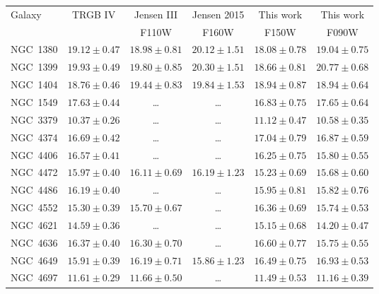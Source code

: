 \begin{tabular}{lccccc}
\toprule
Galaxy & TRGB IV & Jensen III & Jensen 2015 & This work & This work \\
 & & F110W & F160W & F150W & F090W \\
\midrule
NGC~1380 & $19.12\pm0.47$ & $18.98\pm0.81$ & $20.12\pm1.51$ & $18.08\pm0.78$ & $19.04\pm0.75$ \\
NGC~1399 & $19.93\pm0.49$ & $19.80\pm0.85$ & $20.30\pm1.51$ & $18.66\pm0.81$ & $20.77\pm0.68$ \\
NGC~1404 & $18.76\pm0.46$ & $19.44\pm0.83$ & $19.84\pm1.53$ & $18.94\pm0.87$ & $18.94\pm0.64$ \\
NGC~1549 & $17.63\pm0.44$ & \ldots & \ldots & $16.83\pm0.75$ & $17.65\pm0.64$ \\
NGC~3379 & $10.37\pm0.26$ & \ldots & \ldots & $11.12\pm0.47$ & $10.58\pm0.35$ \\
NGC~4374 & $16.69\pm0.42$ & \ldots & \ldots & $17.04\pm0.79$ & $16.87\pm0.59$ \\
NGC~4406 & $16.57\pm0.41$ & \ldots & \ldots & $16.25\pm0.75$ & $15.80\pm0.55$ \\
NGC~4472 & $15.97\pm0.40$ & $16.11\pm0.69$ & $16.19\pm1.23$ & $15.23\pm0.69$ & $15.68\pm0.60$ \\
NGC~4486 & $16.19\pm0.40$ & \ldots & \ldots & $15.95\pm0.81$ & $15.82\pm0.76$ \\
NGC~4552 & $15.30\pm0.39$ & $15.70\pm0.67$ & \ldots & $16.36\pm0.69$ & $15.74\pm0.53$ \\
NGC~4621 & $14.59\pm0.36$ & \ldots & \ldots & $15.15\pm0.68$ & $14.20\pm0.47$ \\
NGC~4636 & $16.37\pm0.40$ & $16.30\pm0.70$ & \ldots & $16.60\pm0.77$ & $15.75\pm0.55$ \\
NGC~4649 & $15.91\pm0.39$ & $16.19\pm0.71$ & $15.86\pm1.23$ & $16.49\pm0.75$ & $16.93\pm0.53$ \\
NGC~4697 & $11.61\pm0.29$ & $11.66\pm0.50$ & \ldots & $11.49\pm0.53$ & $11.16\pm0.39$ \\
\bottomrule
\end{tabular}
